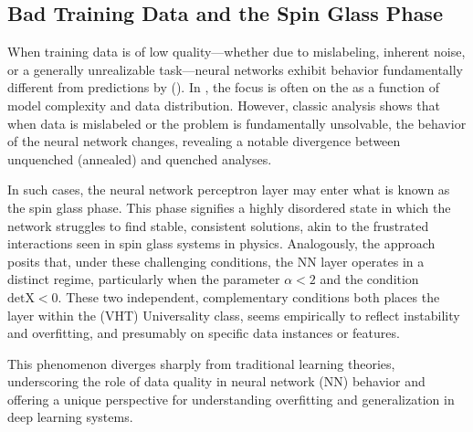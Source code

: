 
\subsection{Bad Training Data and the Spin Glass Phase}
\label{sxn:SMOG_main-spin_glass}

When training data is of low quality—whether due to mislabeling, inherent noise, or a generally unrealizable task—neural networks exhibit behavior fundamentally different from predictions by \StatisticalLearningTheory (\SLT). In \SLT, the focus is often on the \GeneralizationError as a function of model complexity and data distribution. However, classic \STATMECH analysis shows that when data is mislabeled or the problem is fundamentally unsolvable, the behavior of the neural network changes, revealing a notable divergence between unquenched (annealed) and quenched analyses.

In such cases, the neural network perceptron layer may enter what is known as the spin glass phase. This phase signifies a highly disordered state in which the network struggles to find stable, consistent solutions, akin to the frustrated interactions seen in spin glass systems in physics.
Analogously, the \SETOL approach posits that, under these challenging conditions, the NN layer operates in a distinct regime,
particularly when the \HTSR parameter  $\alpha < 2$ and the \TRACELOG condition $\mbox{detX} < 0$.
These two independent, complementary conditions both places the layer within the \emph{\VeryHeavyTailed} (VHT) Universality class,
seems empirically to reflect instability and overfitting, and presumably on specific data instances or features.

This phenomenon diverges sharply from traditional learning theories, underscoring the role of data quality in neural network (NN)
behavior and offering a unique perspective for understanding overfitting and generalization in deep learning systems.


